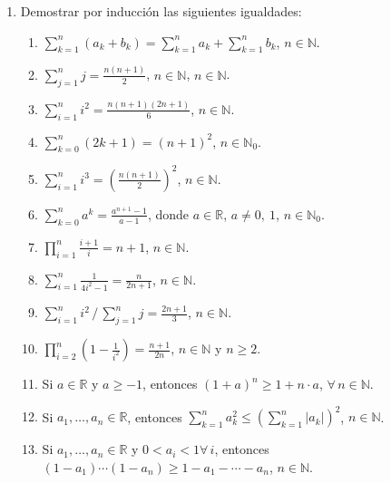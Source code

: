 \documentclass[12pt,spanish,makeidx]{amsbook}
\begin{document}
\begin{enumerate}
\smallskip


\item Demostrar por inducción  las siguientes igualdades:
  \begin{enumerate}
  \item  $\displaystyle{ \sum_{k=1}^n (a_k + b_k) = \sum_{k=1}^n a_k + \sum_{k=1}^n b_k}$, $n\in \mathbb N$.
  \item  $\displaystyle{ \sum_{j=1}^n j = \frac{n(n+1)}{2}}$, $n\in \mathbb N$, $n\in \mathbb N$.
  \item  $\displaystyle{ \sum_{i=1}^n i^2 = \frac{n(n+1)(2n+1)}{6}}$, $n\in \mathbb N$.
  \item  $\displaystyle{ \sum_{k=0}^n (2k+1) = (n+1)^2}$, $n\in \mathbb N_0$.
  \item  $\displaystyle{ \sum_{i=1}^n i^3 = \left( \frac{n(n+1)}{2 }\right)^2}$, $n\in \mathbb N$.
  \item  $\displaystyle{ \sum_{k=0}^n a^k = \frac{a^{n+1}-1}{a-1}}$, donde $a\in {\mathbb R}$, $a \neq 0,\ 1$, $n\in \mathbb N_0$.
  \item  $\displaystyle{ \prod_{i=1}^n \frac{i+1}{i} = n+1}$, $n\in \mathbb N$.

  \item $\displaystyle{ \sum_{i=1}^n \frac{1}{4i^2-1} = \frac{n}{2n+1}}$, $n\in \mathbb N$.

  \item $\displaystyle{ \sum_{i=1}^n i^2\, /\, \sum_{j=1}^n j = \frac{2n+1}{3}}$, $n\in \mathbb N$.

  \item $\displaystyle{ \prod_{i=2}^n \left(1-\frac{1}{i^2}\right) = \frac{n+1}{2n}}$, $n\in \mathbb N$ y $ n\ge 2$.

  \item Si $a\in \mathbb R$ y $a\geq -1$, entonces $(1+a)^n\geq 1+n\cdot a$, $\forall \, n \in \mathbb N$.

  \item Si $a_1,\dots,a_n \in \mathbb R$, entonces $\displaystyle{\sum_{k=1}^n a_{k}^{2}\leq \left(\sum_{k=1}^n |a_{k}|\right)^{2}}$, $n\in \mathbb N$.


  \item Si $a_1,\dots,a_n \in \mathbb R$ y $0<a_i<1 \forall \, i$, entonces $(1-a_1)\cdots(1-a_n)\ge 1-a_1-\cdots -a_n$, $n\in \mathbb N$.

  \end{enumerate}

\smallskip





\end{enumerate}
\end{document}
